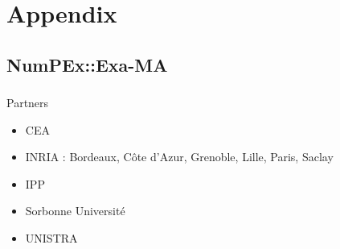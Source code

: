 \appendix
\section{Appendix}
\subsection{NumPEx::Exa-MA}

\begin{frame}
  \frametitle{\insertsectionhead}
  \framesubtitle{\insertsubsectionhead}

  Partners
  \begin{itemize}
    \item CEA 
    \item INRIA : Bordeaux,  Côte d'Azur, Grenoble, Lille, Paris, Saclay
    \item IPP 
    \item Sorbonne Université 
    \item UNISTRA  
  \end{itemize}
\end{frame}


